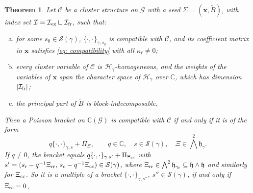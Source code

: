 \documentclass[a4paper]{amsart}
\numberwithin{equation}{section}
\newtheorem{theorem}{Theorem}[section]
\theoremstyle{definition}
\theoremstyle{remark}
\newcommand{\bbC}{\mathbb{C}}
\newcommand{\mfh}{\mathfrak{h}}
\newcommand{\mcG}{\mathcal{G}}
\newcommand{\mcH}{\mathcal{H}}
\newcommand{\mcC}{\mathcal{C}}
\newcommand{\mcS}{\mathcal{S}}
\newcommand{\mcI}{\mathcal{I}}
\newcommand{\bx}{\mathbf{x}}
\newcommand{\tB}{\widetilde{B}}
\newcommand{\rr}{{\rm r}}
\newcommand{\cc}{{\rm c}}
\newcommand{\ex}{{\rm ex}}
\newcommand{\fr}{{\rm fr}}
\newcommand{\toric}{\Pi}
\begin{document}
\begin{theorem}
  \label{thm: uniqueness}
  Let $\mcC$ be a cluster structure on $\mcG$ with a seed $\Sigma=(\bx,\tB)$, with index set $\mcI=\mcI_\ex\sqcup\mcI_\fr$, such that:
  \begin{enumerate}[(a)]
    \item for some $s_0\in\mcS(\gamma)$, $\{\cdot,\cdot\}_{\gamma,s_0}$ is compatible with $\mcC$, and its coefficient matrix in $\bx$ satisfies \eqref{eq: compatibility} with all $\kappa_\ell\neq0$;
    \item every cluster variable of $\mcC$ is $\mcH_\gamma$-homogeneous, and the weights of the variables of $\bx$ span the character space of $\mcH_\gamma$ over $\bbC$, which has dimension $|\mcI_\fr|$;
    \item the principal part of $\tB$ is block-indecomposable.
  \end{enumerate}
  Then a Poisson bracket on $\bbC(\mcG)$ is compatible with $\mcC$ if and only if it is of the form
  \[
    q\{\cdot,\cdot\}_{\gamma,s}+\toric_\Xi,
    \qquad
    q\in\bbC,\quad s\in\mcS(\gamma),\quad \Xi\in\textstyle\bigwedge^2\mfh_\gamma.
  \]
  If $q\neq0$, the bracket equals $q\{\cdot,\cdot\}_{\gamma,s'}+\toric_{\Xi_{\rm rc}}$ with $s'=(s_{\rr}-q^{-1}\Xi_{\rm rr},\,s_{\cc}-q^{-1}\Xi_{\rm cc})\in\mcS(\gamma)$, where $\Xi_{\rm rr}\in\bigwedge^2\mfh_{\gamma_{\rr}}\subseteq\mfh\wedge\mfh$ and similarly for $\Xi_{\rm cc}$.
  So it is a multiple of a bracket $\{\cdot,\cdot\}_{\gamma,s''}$, $s''\in\mcS(\gamma)$, if and only if $\Xi_{\rm rc}=0$.
\end{theorem}
\end{document}
